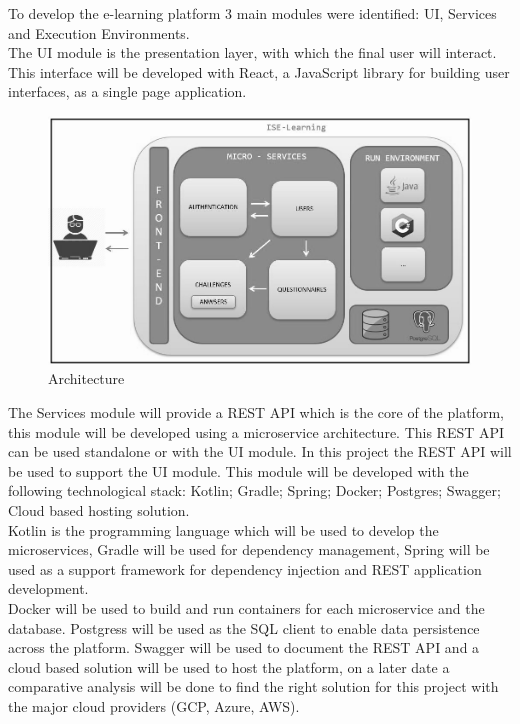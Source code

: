To develop the e-learning platform 3 main modules were identified: UI, Services and Execution Environments.
\\
The UI module is the presentation layer, with which the final user will interact. This interface will be developed with React, a JavaScript library for building user interfaces, as a single page application.
\\
	\begin{figure}
  		\includegraphics[scale=0.6]{./imgs/arquitectura.JPG}
  		\caption{Architecture}
  		\label{fig:architecture}
	\end{figure} 
The Services module will provide a REST API which is the core of the platform, this module will be developed using a microservice architecture. This REST API can be used standalone or with the UI module. In this project the REST API will be used to support the UI module. This module will be developed with the following technological stack: Kotlin; Gradle; Spring; Docker; Postgres; Swagger; Cloud based hosting solution.
\\
Kotlin is the programming language which will be used to develop the microservices, Gradle will be used for dependency management, Spring will be used as a support framework for dependency injection and REST application development.
\\
Docker will be used to build and run containers for each microservice and the database. Postgress will be used as the SQL client to enable data persistence across the platform. Swagger will be used to document the REST API and a cloud based solution will be used to host the platform, on a later date a comparative analysis will be done to find the right solution for this project with the major cloud providers (GCP, Azure, AWS).
\\
 
